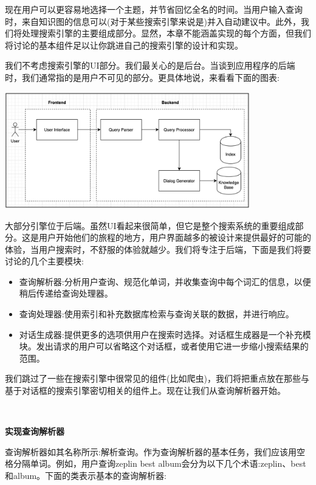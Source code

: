 现在用户可以更容易地选择一个主题，并节省回忆全名的时间。当用户输入查询时，来自知识图的信息可以(对于某些搜索引擎来说是)并入自动建议中。此外，我们将处理搜索引擎的主要组成部分。显然，本章不能涵盖实现的每个方面，但我们将讨论的基本组件足以让你跳进自己的搜索引擎的设计和实现。 \par
我们不考虑搜索引擎的UI部分。我们最关心的是后台。当谈到应用程序的后端时，我们通常指的是用户不可见的部分。更具体地说，来看看下面的图表: \par

\begin{center}
	\includegraphics[width=0.8\textwidth]{content/Section-3/Chapter-16/18}
\end{center}

大部分引擎位于后端。虽然UI看起来很简单，但它是整个搜索系统的重要组成部分。这是用户开始他们的旅程的地方，用户界面越多的被设计来提供最好的可能的体验，当用户搜索时，不舒服的体验就越少。我们将专注于后端，下面是我们将要讨论的几个主要模块: \par

\begin{itemize}
	\item 查询解析器:分析用户查询、规范化单词，并收集查询中每个词汇的信息，以便稍后传递给查询处理器。
	\item 查询处理器:使用索引和补充数据库检索与查询关联的数据，并进行响应。
	\item 对话生成器:提供更多的选项供用户在搜索时选择。对话框生成器是一个补充模块。发出请求的用户可以省略这个对话框，或者使用它进一步缩小搜索结果的范围。
\end{itemize}

我们跳过了一些在搜索引擎中很常见的组件(比如爬虫)，我们将把重点放在那些与基于对话框的搜索引擎密切相关的组件上。现在让我们从查询解析器开始。 \par

\noindent\textbf{}\ \par
\textbf{实现查询解析器} \ \par
查询解析器如其名称所示:解析查询。作为查询解析器的基本任务，我们应该用空格分隔单词。例如，用户查询zeplin best album会分为以下几个术语:zeplin、best和album。下面的类表示基本的查询解析器: \par

